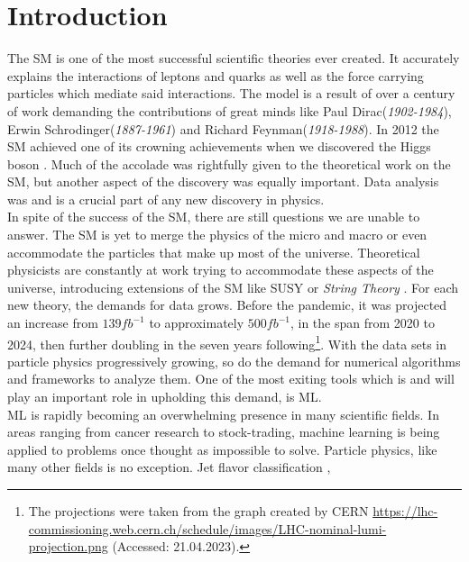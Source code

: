 \chapter*{Introduction}
The \ac{SM} is one of the most successful scientific theories ever
created. It accurately explains the interactions of leptons and quarks as well as the force
carrying particles which mediate said interactions. The model is a result of over a century of work
demanding the contributions of great minds like Paul Dirac(\emph{1902-1984}), Erwin Schrodinger(\emph{1887-1961}) and Richard Feynman(\emph{1918-1988}).
In 2012 the \ac{SM} achieved one of its crowning achievements when we discovered the Higgs boson \cite{Aad_2012}. 
Much of the accolade was rightfully given to the theoretical work on the \ac{SM}, but another aspect of the discovery 
was equally important. Data analysis was and is a crucial part of any new discovery in physics. \newline
\\
In spite of the success of the \ac{SM}, there are still questions we are unable to answer.
The \ac{SM} is yet to merge the physics of the micro and macro or even accommodate the particles that make
up most of the universe. Theoretical physicists are constantly at work trying to accommodate these aspects of the universe,
introducing extensions of the \ac{SM} like \ac{SUSY} \cite{SUSY} or \emph{String Theory} \cite{cole_probing_2021}. For each new theory, 
the demands for data grows. Before the pandemic, it was projected an increase from $139fb^{-1}$ to approximately $500fb^{-1}$, in the span from 
2020 to 2024, then further doubling in the seven years following\footnote{The projections were taken from the graph created by CERN
\href{https://lhc-commissioning.web.cern.ch/schedule/images/LHC-nominal-lumi-projection.png}{https://lhc-commissioning.web.cern.ch/schedule/images/LHC-nominal-lumi-projection.png}
(Accessed: 21.04.2023).}. With the data sets in particle physics progressively growing, so do the demand for numerical algorithms and frameworks to analyze them.
One of the most exiting tools which is and will play an important role in upholding this demand, is \ac{ML}.\newline
\\
\acf{ML} is rapidly becoming an overwhelming presence in many scientific fields.
In areas ranging from cancer research to stock-trading, machine learning is being applied to problems
once thought as impossible to solve. Particle physics, like many other fields is no exception. Jet flavor classification \cite{Guest_2016}, 

